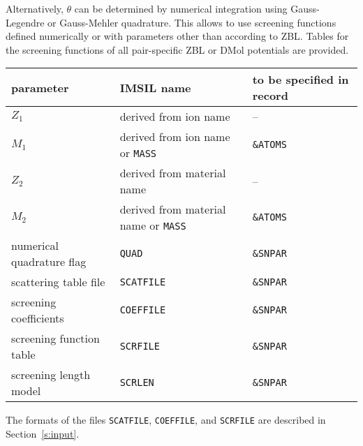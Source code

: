 Alternatively, $\theta$ can be determined by numerical integration using 
Gauss-Legendre or Gauss-Mehler quadrature. This allows to use screening
functions defined numerically or with parameters other than according to
ZBL. Tables for the screening functions of all pair-specific ZBL or DMol
\cite{I9757} potentials are provided.

\begin{center}
\begin{tabular}{lll}
   parameter \quad & IMSIL name \qquad\qquad & to be specified in record \\
   \hline
   $Z_1$           & derived from ion name      & -- \\
   $M_1$           & derived from ion name or 
                     \texttt{MASS}              & \texttt{\&ATOMS} \\
   $Z_2$           & derived from material name & -- \\
   $M_2$           & derived from material name or
                     \texttt{MASS}              & \texttt{\&ATOMS} \\
   numerical 
   quadrature flag & \texttt{QUAD}              & \texttt{\&SNPAR} \\
   scattering 
   table file      & \texttt{SCATFILE}          & \texttt{\&SNPAR} \\
   screening
   coefficients    & \texttt{COEFFILE}          & \texttt{\&SNPAR} \\
   screening 
   function table  & \texttt{SCRFILE}           & \texttt{\&SNPAR} \\
   screening
   length model    & \texttt{SCRLEN}            & \texttt{\&SNPAR} \\
\end{tabular}
\end{center}

The formats of the files \texttt{SCATFILE}, \texttt{COEFFILE}, and 
\texttt{SCRFILE} are described in Section~\ref{s:input}. 

